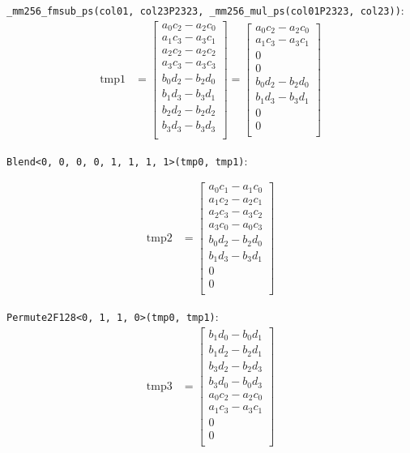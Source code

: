 \documentclass[fontsize = 10pt,DIV = 13]{scrartcl}
\begin{document}
\texttt{_mm256_fmsub_ps(col01, col23P2323, _mm256_mul_ps(col01P2323, col23))}:
\begin{align*}
\mathrm{tmp1} 
&=
\begin{bmatrix}
a_0c_2 - a_2c_0\\
a_1c_3 - a_3c_1\\
a_2c_2 - a_2c_2\\
a_3c_3 - a_3c_3\\
b_0d_2 - b_2d_0\\
b_1d_3 - b_3d_1\\
b_2d_2 - b_2d_2\\
b_3d_3 - b_3d_3\\
\end{bmatrix}
=
\begin{bmatrix}
a_0c_2 - a_2c_0\\
a_1c_3 - a_3c_1\\
0\\
0\\
b_0d_2 - b_2d_0\\
b_1d_3 - b_3d_1\\
0\\
0\\
\end{bmatrix}
\end{align*}


\texttt{Blend<0, 0, 0, 0, 1, 1, 1, 1>(tmp0, tmp1)}:

\begin{align*}
\mathrm{tmp2} 
&=
\begin{bmatrix}
a_0c_1 - a_1c_0\\
a_1c_2 - a_2c_1\\
a_2c_3 - a_3c_2\\
a_3c_0 - a_0c_3\\
b_0d_2 - b_2d_0\\
b_1d_3 - b_3d_1\\
0\\
0\\
\end{bmatrix}
\end{align*}

\texttt{Permute2F128<0, 1, 1, 0>(tmp0, tmp1)}:
\begin{align*}
\mathrm{tmp3} 
&=
\begin{bmatrix}
b_1d_0 - b_0d_1\\
b_1d_2 - b_2d_1\\
b_3d_2 - b_2d_3\\
b_3d_0 - b_0d_3\\
a_0c_2 - a_2c_0\\
a_1c_3 - a_3c_1\\
0\\
0\\
\end{bmatrix}
\end{align*}
\end{document}
